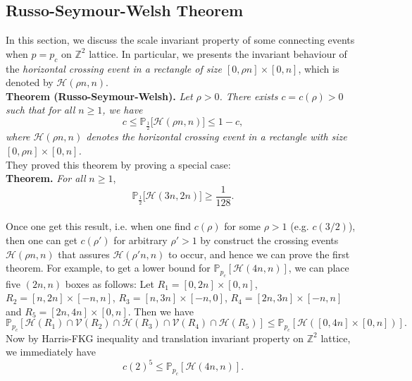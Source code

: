 \documentclass[12pt]{article}
\theoremstyle{plane}
\theoremstyle{definition}
\begin{document}
\subsection{Russo-Seymour-Welsh Theorem}
In this section, we discuss the scale invariant property of some connecting events when $p=p_c$ on $\mathbb{Z}^2$ lattice. In particular, we presents the invariant behaviour of the \textit{horizontal crossing event in a rectangle of size $[0,\rho n]\times[0,n]$}, which is denoted by $\mathcal{H}(\rho n, n)$.\\[12pt]
\textbf{Theorem (Russo-Seymour-Welsh).}
\textit{Let $\rho>0$. There exists $c=c(\rho)>0$ such that for all $n\geq 1$, we have}
\[
c\leq\mathbb{P}_{\frac{1}{2}}\big[\mathcal{H}(\rho n, n)\big]\leq 1-c,
\]
\textit{where $\mathcal{H}(\rho n, n)$ denotes the horizontal crossing event in a rectangle with size $[0,\rho n]\times [0,n]$.}\\[12pt]
They proved this theorem by proving a special case:\\
\textbf{Theorem.} \textit{For all }$n\geq 1$,
\begin{equation*}
\mathbb{P}_{\frac{1}{2}}\big[\mathcal{H}(3n,2n)\big]\geq\frac{1}{128}.
\end{equation*}\\
Once one get this result, i.e. when one find $c(\rho)$ for some $\rho>1$ (e.g. $c(3/2)$), then one can get $c(\rho')$ for arbitrary $\rho'>1$ by construct the crossing events $\mathcal{H}(\rho n,n)$ that assures $\mathcal{H}(\rho'n, n)$ to occur, and hence we can prove the first theorem. For example, to get a lower bound for $\mathbb{P}_{p_c}[\mathcal{H}(4n,n)]$, we can place five $(2n,n)$ boxes as follows: Let $R_1=[0,2n]\times[0,n]$, $R_2=[n,2n]\times[-n,n]$, $R_3=[n,3n]\times[-n,0]$, $R_4=[2n,3n]\times[-n,n]$ and $R_5=[2n,4n]\times[0,n]$. Then we have
\begin{equation*}
\mathbb{P}_{p_c}[\mathcal{H}(R_1)\cap\mathcal{V}(R_2)\cap\mathcal{H}(R_3)\cap\mathcal{V}(R_4)\cap\mathcal{H}(R_5)]\leq\mathbb{P}_{p_c}[\mathcal{H}([0,4n]\times[0,n])].
\end{equation*}
Now by Harris-FKG inequality and translation invariant property on $\mathbb{Z}^2$ lattice, we immediately have
\begin{equation*}
c(2)^5\leq \mathbb{P}_{p_c}[\mathcal{H}(4n,n)].
\end{equation*}
\end{document}
